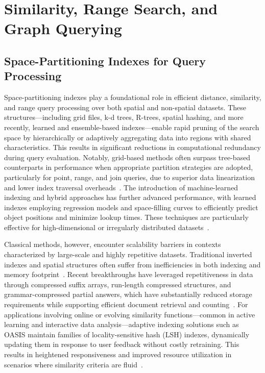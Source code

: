 \documentclass[sigconf]{acmart}
\begin{document}
\section{Similarity, Range Search, and Graph Querying}

\subsection{Space-Partitioning Indexes for Query Processing}

Space-partitioning indexes play a foundational role in efficient distance, similarity, and range query processing over both spatial and non-spatial datasets. These structures—including grid files, k-d trees, R-trees, spatial hashing, and more recently, learned and ensemble-based indexes—enable rapid pruning of the search space by hierarchically or adaptively aggregating data into regions with shared characteristics. This results in significant reductions in computational redundancy during query evaluation. Notably, grid-based methods often surpass tree-based counterparts in performance when appropriate partition strategies are adopted, particularly for point, range, and join queries, due to superior data linearization and lower index traversal overheads~\cite{ref31,ref35}. The introduction of machine-learned indexing and hybrid approaches has further advanced performance, with learned indexes employing regression models and space-filling curves to efficiently predict object positions and minimize lookup times. These techniques are particularly effective for high-dimensional or irregularly distributed datasets~\cite{ref35,ref51,ref54,ref111}.

Classical methods, however, encounter scalability barriers in contexts characterized by large-scale and highly repetitive datasets. Traditional inverted indexes and spatial structures often suffer from inefficiencies in both indexing and memory footprint~\cite{ref75,ref98}. Recent breakthroughs have leveraged repetitiveness in data through compressed suffix arrays, run-length compressed structures, and grammar-compressed partial answers, which have substantially reduced storage requirements while supporting efficient document retrieval and counting~\cite{ref73,ref91}. For applications involving online or evolving similarity functions—common in active learning and interactive data analysis—adaptive indexing solutions such as OASIS maintain families of locality-sensitive hash (LSH) indexes, dynamically updating them in response to user feedback without costly retraining. This results in heightened responsiveness and improved resource utilization in scenarios where similarity criteria are fluid~\cite{ref56,ref111}.
\end{document}

